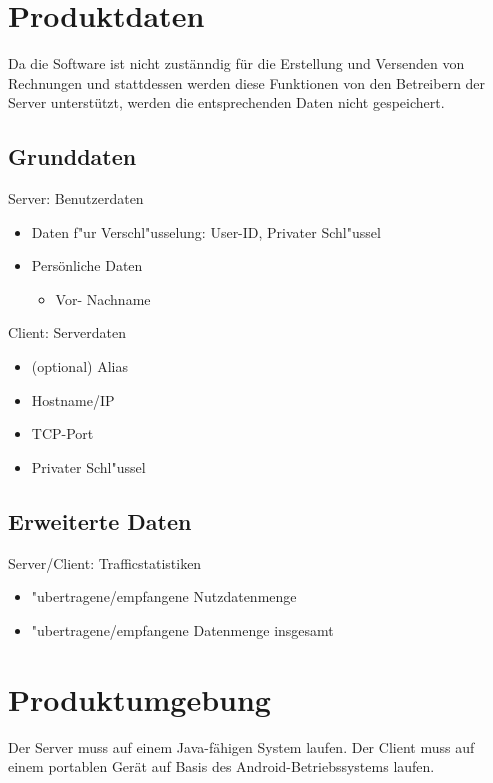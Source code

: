 \documentclass[a4paper,10pt]{scrartcl}
\begin{document}
\section{Produktdaten}
Da die Software ist nicht zustänndig für die Erstellung und Versenden von Rechnungen
und stattdessen werden diese Funktionen von den Betreibern der Server unterstützt, 
werden die entsprechenden Daten nicht gespeichert.

\subsection{Grunddaten}
\begin{usecase}
 {Server: Benutzerdaten
   \begin{itemize}
   \item Daten f"ur Verschl"usselung: User-ID, Privater Schl"ussel
   \item Persönliche Daten
	 \begin{itemize}
	 \item Vor- Nachname
   \end{itemize}
	 \end{itemize}
}
 {Client: Serverdaten
   \begin{itemize}
   \item (optional) Alias
   \item Hostname/IP
   \item TCP-Port
   \item Privater Schl"ussel
   \end{itemize}
}
\end{usecase}

\subsection{Erweiterte Daten}
\begin{usecase}
 {Server/Client: Trafficstatistiken
   \begin{itemize}
   \item "ubertragene/empfangene Nutzdatenmenge
   \item "ubertragene/empfangene Datenmenge insgesamt
   \end{itemize}
}
\end{usecase}

\section{Produktumgebung}
Der Server muss auf einem Java-fähigen System laufen.
Der Client muss auf einem portablen Gerät auf Basis des Android-Betriebssystems laufen.
\end{document}
